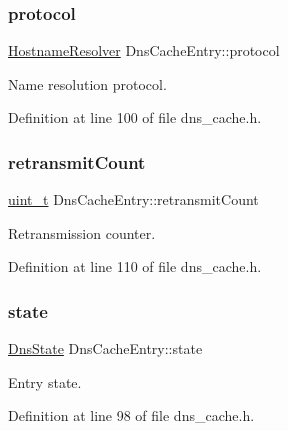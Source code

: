 \subsubsection{\texorpdfstring{protocol}{protocol}}
{\footnotesize\ttfamily \hyperlink{socket_8h_adb58068eb0cfd0e54798ac480eb19f94}{Hostname\+Resolver} Dns\+Cache\+Entry\+::protocol}



Name resolution protocol. 



Definition at line 100 of file dns\+\_\+cache.\+h.

\mbox{\label{structDnsCacheEntry_aa1813da7ebe162f069a6079aa2365db1}} 
\subsubsection{\texorpdfstring{retransmit\+Count}{retransmitCount}}
{\footnotesize\ttfamily \hyperlink{compiler__port_8h_a12a1e9b3ce141648783a82445d02b58d}{uint\+\_\+t} Dns\+Cache\+Entry\+::retransmit\+Count}



Retransmission counter. 



Definition at line 110 of file dns\+\_\+cache.\+h.

\mbox{\label{structDnsCacheEntry_ac0f0a02b2f1fece9d83ec3345bb618c0}} 
\subsubsection{\texorpdfstring{state}{state}}
{\footnotesize\ttfamily \hyperlink{dns__cache_8h_a57ef307e25adab4205cf584115875ef3}{Dns\+State} Dns\+Cache\+Entry\+::state}



Entry state. 



Definition at line 98 of file dns\+\_\+cache.\+h.

\mbox{\label{structDnsCacheEntry_a5bf3981653624c3e313f7f364b526cdb}} 
